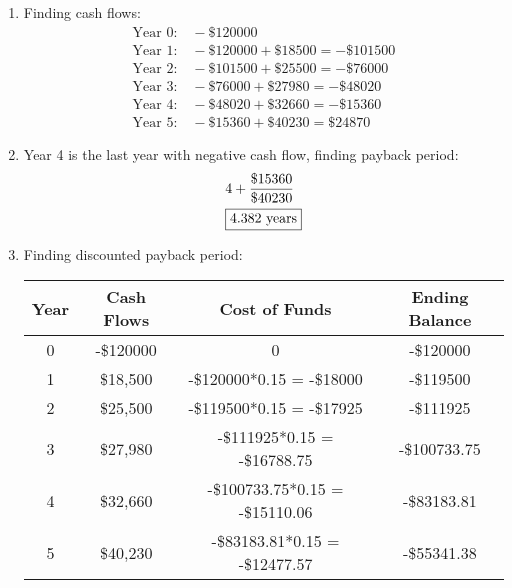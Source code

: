 \documentclass[../INDE250HW.tex]{subfiles}
\begin{document}
\begin{enumerate}
    \item Finding cash flows:
        \begin{equation*}
            \begin{aligned}
                \text{Year 0:} \quad -\$120000 \\
                \text{Year 1:} \quad -\$120000 + \$18500 = -\$101500 \\
                \text{Year 2:} \quad -\$101500 + \$25500 = -\$76000 \\
                \text{Year 3:} \quad -\$76000 + \$27980 = -\$48020 \\
                \text{Year 4:} \quad -\$48020 + \$32660 = -\$15360 \\
                \text{Year 5:} \quad -\$15360 + \$40230 = \$24870
            \end{aligned}
        \end{equation*}
    \item Year 4 is the last year with negative cash flow, finding payback period:
        \begin{equation*}
            \begin{aligned}
                &4 + \frac{\$15360}{\$40230} \\
                &\framebox{$4.382\text{ years}$} 
            \end{aligned}
        \end{equation*}
    \item Finding discounted payback period: \\
        \begin{center}
            \begin{tabular}{ c c c c }
                Year & Cash Flows & Cost of Funds & Ending Balance\\
                \hline
                0   &   -\$120000   &   0   &   -\$120000 \\   
                1   &   \$18,500    &   -\$120000*0.15 = -\$18000   &   -\$119500 \\
                2   &   \$25,500    &   -\$119500*0.15 = -\$17925   &   -\$111925 \\
                3   &   \$27,980    &   -\$111925*0.15 = -\$16788.75    &   -\$100733.75 \\
                4   &   \$32,660    &   -\$100733.75*0.15 = -\$15110.06 &   -\$83183.81\\
                5   &   \$40,230    &   -\$83183.81*0.15 = -\$12477.57 & -\$55341.38
            \end{tabular}
        \end{center}
\end{enumerate}
\end{document}
